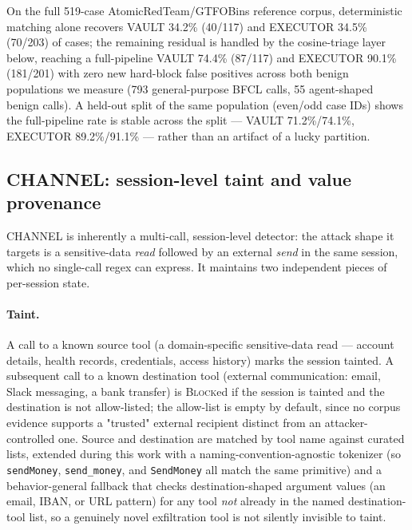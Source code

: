 \documentclass[sigconf,anonymous,review]{acmart}
\begin{document}
On the full 519-case AtomicRedTeam/GTFOBins reference corpus, deterministic
matching alone recovers VAULT 34.2\% (40/117) and EXECUTOR 34.5\% (70/203) of
cases; the remaining residual is handled by the cosine-triage layer below,
reaching a full-pipeline VAULT 74.4\% (87/117) and EXECUTOR 90.1\% (181/201)
with zero new hard-block false positives across both benign populations we
measure (793 general-purpose BFCL calls, 55 agent-shaped benign calls). A
held-out split of the same population (even/odd case IDs) shows the
full-pipeline rate is stable across the split --- VAULT 71.2\%/74.1\%,
EXECUTOR 89.2\%/91.1\% --- rather than an artifact of a lucky partition.

\subsection{CHANNEL: session-level taint and value provenance}
\label{sec:channel}

CHANNEL is inherently a multi-call, session-level detector: the attack shape
it targets is a sensitive-data \emph{read} followed by an external
\emph{send} in the same session, which no single-call regex can express. It
maintains two independent pieces of per-session state.

\paragraph{Taint.} A call to a known source tool (a domain-specific
sensitive-data read --- account details, health records, credentials, access
history) marks the session tainted. A subsequent call to a known destination
tool (external communication: email, Slack messaging, a bank transfer) is
\textsc{Block}ed if the session is tainted and the destination is not
allow-listed; the allow-list is empty by default, since no corpus evidence
supports a "trusted" external recipient distinct from an attacker-controlled
one. Source and destination are matched by tool name against curated lists,
extended during this work with a naming-convention-agnostic tokenizer (so
\texttt{sendMoney}, \texttt{send\_money}, and \texttt{SendMoney} all match
the same primitive) and a behavior-general fallback that checks
destination-shaped argument values (an email, IBAN, or URL pattern) for any
tool \emph{not} already in the named destination-tool list, so a genuinely
novel exfiltration tool is not silently invisible to taint.
\end{document}
